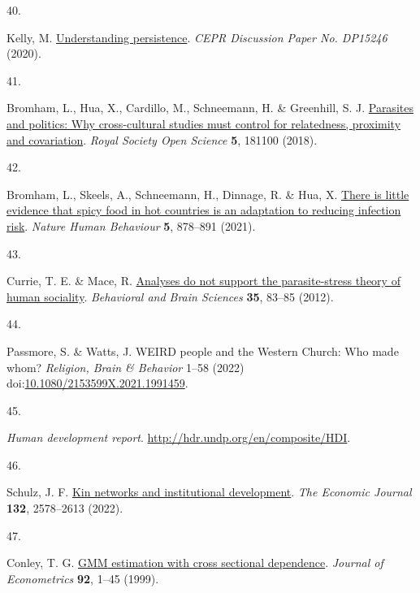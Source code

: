 \documentclass[
  man,floatsintext]{apa6}
\newlength{\cslhangindent}
\newlength{\csllabelwidth}
\newlength{\cslentryspacingunit} %
\newenvironment{CSLReferences}[2] %
 {%
  \setlength{\parindent}{0pt}
  \ifodd #1
  \let\oldpar\par
  \def\par{\hangindent=\cslhangindent\oldpar}
  \fi
  \setlength{\parskip}{#2\cslentryspacingunit}
 }%
 {}
\newcommand{\CSLLeftMargin}[1]{\parbox[t]{\csllabelwidth}{#1}}
\newcommand{\CSLRightInline}[1]{\parbox[t]{\linewidth - \csllabelwidth}{#1}\break}
\begin{document}
\begin{CSLReferences}{0}{0}
\leavevmode{}%
\CSLLeftMargin{40. }%
\CSLRightInline{Kelly, M. \href{http://ssrn.com/abstract=3688200}{Understanding persistence}. \emph{CEPR Discussion Paper No. DP15246} (2020).}

\leavevmode{}%
\CSLLeftMargin{41. }%
\CSLRightInline{Bromham, L., Hua, X., Cardillo, M., Schneemann, H. \& Greenhill, S. J. \href{https://doi.org/10.1098/rsos.181100}{Parasites and politics: Why cross-cultural studies must control for relatedness, proximity and covariation}. \emph{Royal Society Open Science} \textbf{5}, 181100 (2018).}

\leavevmode{}%
\CSLLeftMargin{42. }%
\CSLRightInline{Bromham, L., Skeels, A., Schneemann, H., Dinnage, R. \& Hua, X. \href{https://doi.org/10.1038/s41562-020-01039-8}{There is little evidence that spicy food in hot countries is an adaptation to reducing infection risk}. \emph{Nature Human Behaviour} \textbf{5}, 878--891 (2021).}

\leavevmode{}%
\CSLLeftMargin{43. }%
\CSLRightInline{Currie, T. E. \& Mace, R. \href{https://doi.org/10.1017/S0140525X11000963}{Analyses do not support the parasite-stress theory of human sociality}. \emph{Behavioral and Brain Sciences} \textbf{35}, 83--85 (2012).}

\leavevmode{}%
\CSLLeftMargin{44. }%
\CSLRightInline{Passmore, S. \& Watts, J. {WEIRD} people and the {W}estern {C}hurch: Who made whom? \emph{Religion, Brain \& Behavior} 1--58 (2022) doi:\href{https://doi.org/10.1080/2153599X.2021.1991459}{10.1080/2153599X.2021.1991459}.}

\leavevmode{}%
\CSLLeftMargin{45. }%
\CSLRightInline{\emph{Human development report}. \url{http://hdr.undp.org/en/composite/HDI}.}

\leavevmode{}%
\CSLLeftMargin{46. }%
\CSLRightInline{Schulz, J. F. \href{https://doi.org/10.1093/ej/ueac027}{Kin networks and institutional development}. \emph{The Economic Journal} \textbf{132}, 2578--2613 (2022).}

\leavevmode{}%
\CSLLeftMargin{47. }%
\CSLRightInline{Conley, T. G. \href{https://doi.org/10.1016/S0304-4076(98)00084-0}{{GMM} estimation with cross sectional dependence}. \emph{Journal of Econometrics} \textbf{92}, 1--45 (1999).}


\end{CSLReferences}
\end{document}
